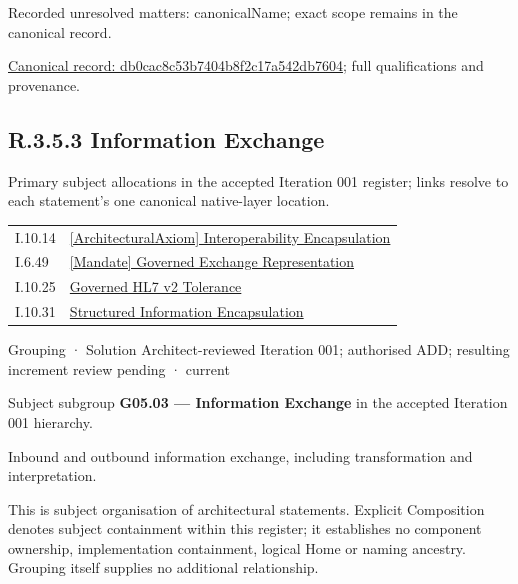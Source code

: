 {\small Recorded unresolved matters: canonicalName; exact scope remains in the canonical record.}\par
{\footnotesize \href{../../../../continuum/grouping/db0cac8c53b7404b8f2c17a542db7604.md}{Canonical record: db0cac8c53b7404b8f2c17a542db7604}; full qualifications and provenance.}\par
\subsection*{R.3.5.3 Information Exchange}
\label{navigation:R.3.5.3}

Primary subject allocations in the accepted Iteration 001 register; links resolve to each statement’s one canonical native-layer location.\par
\begin{longtable}{p{.22\linewidth}p{.73\linewidth}}
I.10.14 & \hyperref[element:e9e0b4f82b6544e7ba87651c578d82c2]{[ArchitecturalAxiom] Interoperability Encapsulation} \\
I.6.49 & \hyperref[element:e9d06b3fe6b744cc86bd2a136e02165a]{[Mandate] Governed Exchange Representation} \\
I.10.25 & \hyperref[element:0968fc163ae54514bc1f02471fe6d866]{Governed HL7 v2 Tolerance} \\
I.10.31 & \hyperref[element:6973441f2d62448188af9bfce5ad9d9f]{Structured Information Encapsulation} \\
\end{longtable}
\label{element:bda335658c29473d9ba20352242c83f8}
{\small Grouping · Solution Architect-reviewed Iteration 001; authorised ADD; resulting increment review pending · current}\par

Subject subgroup \textbf{G05.03 — Information Exchange} in the accepted Iteration 001 hierarchy.



Inbound and outbound information exchange, including transformation and interpretation.



This is subject organisation of architectural statements. Explicit Composition denotes subject containment within this register; it establishes no component ownership, implementation containment, logical Home or naming ancestry. Grouping itself supplies no additional relationship.


